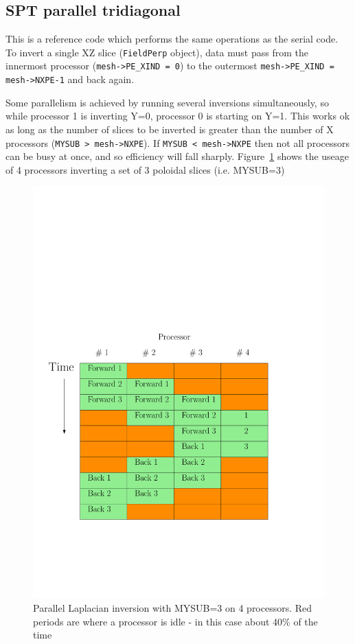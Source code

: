 \documentclass[12pt]{article}
\begin{document}
\subsection{SPT parallel tridiagonal}

This is a reference code which performs the same operations as the serial code.
To invert a single XZ slice (\lstinline!FieldPerp! object), data must pass
from the innermost processor (\lstinline!mesh->PE_XIND = 0!) to the outermost
\lstinline!mesh->PE_XIND = mesh->NXPE-1! and back again.

Some parallelism is achieved by running several inversions simultaneously,
so while processor 1 is inverting Y=0, processor 0 is starting on Y=1.
This works ok as long as the number of slices to be inverted is greater than
the number of X processors (\lstinline!MYSUB > mesh->NXPE!). If
\lstinline!MYSUB < mesh->NXPE! then
not all processors can be busy at once, and so efficiency will fall sharply.
Figure~\ref{fig:par_laplace} shows the useage of 4 processors inverting a set
of 3 poloidal slices
(i.e. MYSUB=3)
\begin{figure}[htbp!]
\centering
\includegraphics[width=0.5\paperwidth, keepaspectratio]{figs/par_laplace.pdf}
\caption{Parallel Laplacian inversion with MYSUB=3 on 4 processors. Red periods are where a processor is idle - in this case about 40\% of the time}
\label{fig:par_laplace}
\end{figure}
\end{document}
